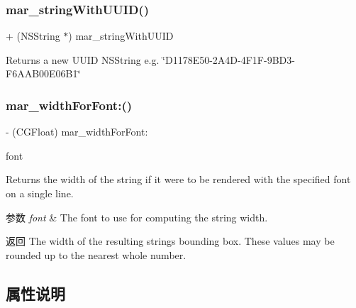 \subsubsection{\texorpdfstring{mar\+\_\+string\+With\+U\+U\+I\+D()}{mar\_stringWithUUID()}}
{\footnotesize\ttfamily + (N\+S\+String $\ast$) mar\+\_\+string\+With\+U\+U\+ID \begin{DoxyParamCaption}{ }\end{DoxyParamCaption}}

Returns a new U\+U\+ID N\+S\+String e.\+g. \char`\"{}\+D1178\+E50-\/2\+A4\+D-\/4\+F1\+F-\/9\+B\+D3-\/\+F6\+A\+A\+B00\+E06\+B1\char`\"{} \mbox{\label{category_n_s_string_07_m_a_r_e_x_08_a5cee15474217cc982a9412c78e0006b4}} 
\subsubsection{\texorpdfstring{mar\+\_\+width\+For\+Font\+:()}{mar\_widthForFont:()}}
{\footnotesize\ttfamily -\/ (C\+G\+Float) mar\+\_\+width\+For\+Font\+: \begin{DoxyParamCaption}\item[{(U\+I\+Font $\ast$)}]{font }\end{DoxyParamCaption}}

Returns the width of the string if it were to be rendered with the specified font on a single line.


\begin{DoxyParams}{参数}
{\em font} & The font to use for computing the string width.\\
\hline
\end{DoxyParams}
\begin{DoxyReturn}{返回}
The width of the resulting string\textquotesingle{}s bounding box. These values may be rounded up to the nearest whole number. 
\end{DoxyReturn}


\subsection{属性说明}
\mbox{\label{category_n_s_string_07_m_a_r_e_x_08_aa059782e115e39da8da025061f9492cb}} 
